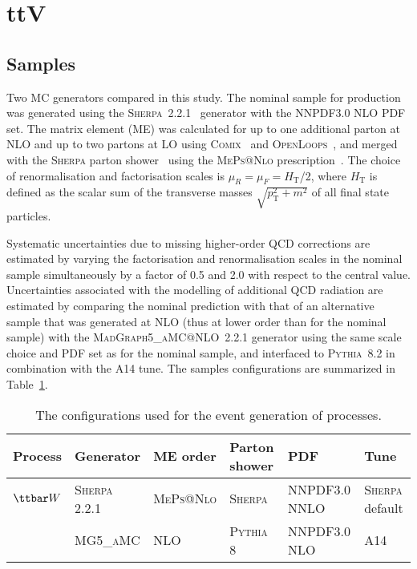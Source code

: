 \section{ttV}
\label{sec:ttV}


\subsection{Samples}
Two MC generators compared in this study.
The nominal sample for \ttW production was generated using the \textsc{Sherpa}~2.2.1~\cite{sherpa} generator with the NNPDF3.0 NLO PDF set.
The matrix element (ME) was calculated for up to one additional parton at NLO and up to two partons at LO using
\textsc{Comix}~\cite{Gleisberg:2008fv} and \textsc{OpenLoops}~\cite{Cascioli:2011va}, and merged with the \textsc{Sherpa} parton shower~\cite{Schumann:2007mg} using the \textsc{MePs@Nlo} prescription~\cite{Hoeche:2012yf}.
The choice of renormalisation and factorisation scales is $\mu_R = \mu_F = H_\textrm{T}$/2, where $H_\textrm{T}$ is defined as the scalar sum of the transverse masses $\sqrt{p_\textrm{T}^2+m^2}$ of all final state particles.



Systematic uncertainties due to missing higher-order QCD corrections are estimated by varying the factorisation and renormalisation scales in the nominal sample simultaneously by a factor of 0.5 and 2.0 with respect to the central value. 
Uncertainties associated with the modelling of additional QCD radiation are estimated by comparing the nominal \ttW prediction with that of an alternative sample that was generated at NLO (thus at lower order than for the nominal sample) with the \textsc{MadGraph5\_aMC@NLO}~2.2.1 generator using the same scale choice and PDF set as for the nominal sample, and interfaced to \textsc{Pythia}~8.2 in combination with the A14 tune. 
The samples configurations are summarized in Table~\ref{tab:mcconfig}.
\begin{table}
\begin{center}
\caption{\label{tab:mcconfig}
The configurations used for the event generation of \ttW processes.}
\vspace{0.25cm}
{\small
\setlength\tabcolsep{1.5pt}
\begin{tabular}{llllll}
\hline\hline
Process & Generator & ME order & Parton shower & PDF & Tune  \\
\hline
$\ttbar W$  & \textsc{Sherpa 2.2.1} & \textsc{MePs@Nlo} & \textsc{Sherpa} &  NNPDF3.0 NNLO & \textsc{Sherpa} default \\
& \textsc{MG5\_aMC} & NLO & \textsc{Pythia} 8 & NNPDF3.0 NLO & A14   \\
\hline\hline
\end{tabular}
}
\end{center}
\end{table}


